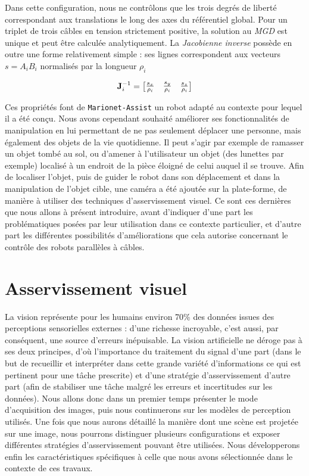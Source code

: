 Dans cette configuration, nous ne contrôlons que les trois degrés de liberté 
correspondant aux translations le long des axes du référentiel global. Pour un 
triplet de trois câbles en tension strictement positive, la solution au {\it 
MGD} est unique et peut être calculée analytiquement. La {\it Jacobienne 
inverse} possède en outre une forme relativement simple : ses lignes 
correspondent aux vecteurs $s = A_iB_i$ normalisés par la longueur $\rho_i$

\begin{equation}
{\bf J}^{-1}_i =
\begin{bmatrix}
 \frac {s_x} {\rho_i} & \frac {s_y} {\rho_i} & \frac {s_z} {\rho_i}
\end{bmatrix}
\label{intro:eq11b}
\end{equation}

Ces propriétés font de {\tt Marionet-Assist} un robot adapté au contexte pour 
lequel il a été conçu. Nous avons cependant souhaité améliorer ses 
fonctionnalités de manipulation en lui permettant de ne pas seulement déplacer 
une personne, mais également des objets de la vie quotidienne. Il peut s'agir 
par exemple de ramasser un objet tombé au sol, ou d'amener à l'utilisateur un 
objet (des lunettes par exemple) localisé à un endroit de la pièce éloigné de 
celui auquel il se trouve. Afin de localiser l'objet, puis de guider le robot 
dans son déplacement et dans la manipulation de l'objet cible, une caméra a été 
ajoutée sur la plate-forme, de manière à utiliser des techniques 
d'asservissement visuel. Ce sont ces dernières que nous allons à présent 
introduire, avant d'indiquer d'une part les problématiques posées par leur 
utilisation dans ce contexte particulier, et d'autre part les différentes 
possibilités d'améliorations que cela autorise concernant le contrôle des robots 
parallèles à câbles.

\section{Asservissement visuel} \label{chap0-3}

La vision représente pour les humains environ 70\% des données issues des 
perceptions sensorielles externes \cite{purves2004neuroscience} : d'une richesse 
incroyable, c'est aussi, par conséquent, une source d'erreurs inépuisable. La 
vision artificielle ne déroge pas à ses deux principes, d'où l'importance du 
traitement du signal d'une part (dans le but de recueillir et interpréter dans 
cette grande variété d'informations ce qui est pertinent pour une tâche 
prescrite) et
d'une stratégie d'asservissement d'autre part (afin de stabiliser une tâche 
malgré les erreurs et incertitudes sur les données). Nous allons donc dans un 
premier temps présenter le mode d'acquisition des images, puis nous 
continuerons sur les modèles de perception utilisés. Une fois que nous aurons 
détaillé la manière dont une scène est projetée sur une image, nous pourrons 
distinguer plusieurs configurations et exposer différentes stratégies 
d'asservissement pouvant être utilisées. Nous développerons enfin les 
caractéristiques spécifiques à celle que nous avons sélectionnée dans le 
contexte de ces travaux.
 
